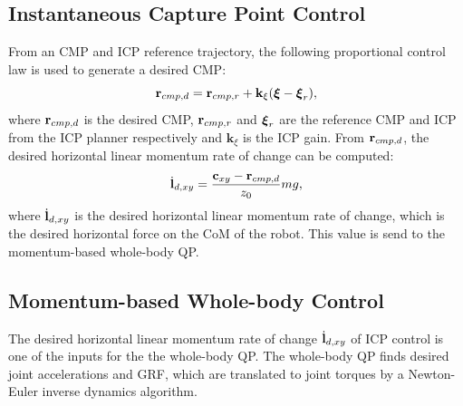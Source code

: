 \subsection{Instantaneous Capture Point Control}\label{sec:icpcontrol}
From an \ac{CMP} and \ac{ICP} reference trajectory, the following proportional control law is used to generate a desired \ac{CMP}:
\begin{equation}
    \mathbf{r}_{cmp,d}=\mathbf{r}_{cmp,r} + \mathbf{k}_{\xi}(\boldsymbol{\xi}-\boldsymbol{\xi}_r),
    \label{eq:rcmpd}
\end{equation}
where $\mathbf{r}_{cmp,d}$ is the desired \ac{CMP}, $\mathbf{r}_{cmp,r}$ and $\boldsymbol{\xi}_r$ are the reference \ac{CMP} and \ac{ICP} from the \ac{ICP} planner respectively and $\mathbf{k}_{\xi}$ is the \ac{ICP} gain. From $\mathbf{r}_{cmp,d}$, the desired horizontal linear momentum rate of change can be computed:
\begin{equation}\label{eq:dotldxy}
    \dot{\mathbf{l}}_{d,xy} = \frac{\mathbf{c}_{xy}-\mathbf{r}_{cmp,d}}{z_0}mg,
\end{equation}
where $\dot{\mathbf{l}}_{d,xy}$ is the desired horizontal linear momentum rate of change, which is the desired horizontal force on the \ac{CoM} of the robot. This value is send to the momentum-based whole-body \ac{QP}. 

\subsection{Momentum-based Whole-body Control}
The desired horizontal linear momentum rate of change $\dot{\mathbf{l}}_{d,xy}$ of \ac{ICP} control is one of the inputs for the the whole-body \ac{QP}. The whole-body \ac{QP} finds desired joint accelerations and \ac{GRF}, which are translated to joint torques by a Newton-Euler inverse dynamics algorithm.
